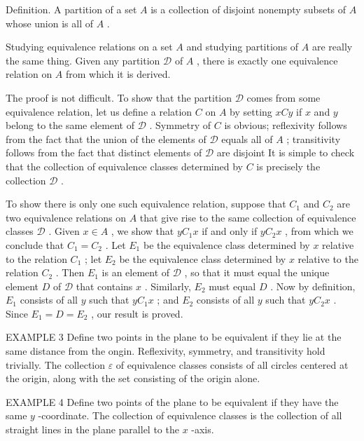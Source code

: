Definition. A partition of a set \(A\) is a collection of disjoint nonempty subsets of \(A\) whose union is all of \(A\) .

Studying equivalence relations on a set \(A\) and studying partitions of \(A\) are really the same thing. Given any partition \(\mathcal{D}\) of \(A\) , there is exactly one equivalence relation on \(A\) from which it is derived.

The proof is not difficult. To show that the partition \(\mathcal{D}\) comes from some equivalence relation, let us define a relation \(C\) on \(A\) by setting \({xCy}\) if \(x\) and \(y\) belong to the same element of \(\mathcal{D}\) . Symmetry of \(C\) is obvious; reflexivity follows from the fact that the union of the elements of \(\mathcal{D}\) equals all of \(A\) ; transitivity follows from the fact that distinct elements of \(\mathcal{D}\) are disjoint It is simple to check that the collection of equivalence classes determined by \(C\) is precisely the collection \(\mathcal{D}\) .

To show there is only one such equivalence relation, suppose that \({C}_{1}\) and \({C}_{2}\) are two equivalence relations on \(A\) that give rise to the same collection of equivalence classes \(\mathcal{D}\) . Given \(x \in  A\) , we show that \(y{C}_{1}x\) if and only if \(y{C}_{2}x\) , from which we conclude that \({C}_{1} = {C}_{2}\) . Let \({E}_{1}\) be the equivalence class determined by \(x\) relative to the relation \({C}_{1}\) ; let \({E}_{2}\) be the equivalence class determined by \(x\) relative to the relation \({C}_{2}\) . Then \({E}_{1}\) is an element of \(\mathcal{D}\) , so that it must equal the unique element \(D\) of \(\mathcal{D}\) that contains \(x\) . Similarly, \({E}_{2}\) must equal \(D\) . Now by definition, \({E}_{1}\) consists of all \(y\) such that \(y{C}_{1}x\) ; and \({E}_{2}\) consists of all \(y\) such that \(y{C}_{2}x\) . Since \({E}_{1} = D = {E}_{2}\) , our result is proved.

EXAMPLE 3 Define two points in the plane to be equivalent if they lie at the same distance from the ongin. Reflexivity, symmetry, and transitivity hold trivially. The collection \(\varepsilon\) of equivalence classes consists of all circles centered at the origin, along with the set consisting of the origin alone.

EXAMPLE 4 Define two points of the plane to be equivalent if they have the same \(y\) -coordinate. The collection of equivalence classes is the collection of all straight lines in the plane parallel to the \(x\) -axis.

